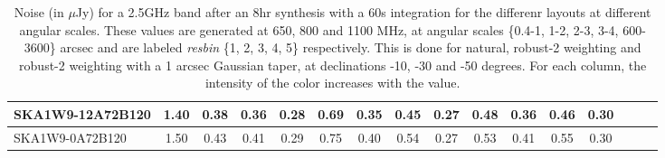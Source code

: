 \begin{table}[!htp]
{{\begin{tabular}{|lccccc||ccccc||ccccc|}
SKA1W9-12A72B120 & 1.40 \cellcolor{blue!18.00} & 0.38 \cellcolor{red!18.00} & 0.36 \cellcolor{green!18.00} & 0.28 \cellcolor{orange!39.00} & 0.69 \cellcolor{blue!18.00} & 0.35 \cellcolor{red!18.00} & 0.45 \cellcolor{green!18.00} & 0.27 \cellcolor{orange!60.00} & 0.48 \cellcolor{blue!18.00} & 0.36 \cellcolor{red!18.00} & 0.46 \cellcolor{green!18.00} & 0.30 \cellcolor{orange!60.00}\\ \hline 
SKA1W9-0A72B120 & 1.50 \cellcolor{blue!24.00} & 0.43 \cellcolor{red!28.50} & 0.41 \cellcolor{green!33.00} & 0.29 \cellcolor{orange!60.00} & 0.75 \cellcolor{blue!24.15} & 0.40 \cellcolor{red!29.05} & 0.54 \cellcolor{green!60.00} & 0.27 \cellcolor{orange!60.00} & 0.53 \cellcolor{blue!23.12} & 0.41 \cellcolor{red!30.35} & 0.55 \cellcolor{green!60.00} & 0.30 \cellcolor{orange!60.00}\tabularnewline \hline 
\end{tabular}}\hfil 

\caption{Noise (in $\mu$Jy) for a 2.5GHz band after an 8hr synthesis with a 60s integration for the differenr layouts at different angular scales. These values are generated at 650, 800 and 1100 MHz, at angular scales \{0.4-1, 1-2, 2-3, 3-4, 600-3600\} arcsec and are labeled {\it resbin} \{1, 2, 3, 4, 5\} respectively. This is done for natural, robust-2 weighting and robust-2 weighting with a 1 arcsec Gaussian taper, at declinations -10, -30 and -50 degrees. For each column, the intensity of the color increases with the value.}\label{tab:noise2500}}
 \end{table}